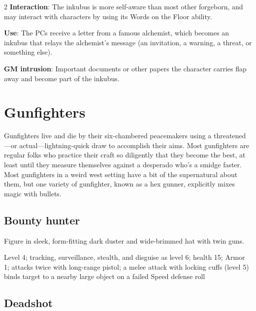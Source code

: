 \begin{multicols}{2}
\textbf{Interaction}: The inkubus is more self-aware than most other forgeborn, and may interact with characters by using its Words on the Floor ability. 

\textbf{Use}: The PCs receive a letter from a famous alchemist, which becomes an inkubus that relays the alchemist’s message (an invitation, a warning, a threat, or something else).

\textbf{GM intrusion}: Important documents or other papers the character carries flap away and become part of the inkubus.

\section{Gunfighters}

Gunfighters live and die by their six-chambered peacemakers using a threatened—or actual—lightning-quick draw to accomplish their aims. Most gunfighters are regular folks who practice their craft so diligently that they become the best, at least until they measure themselves against a desperado who’s a smidge faster. Most gunfighters in a weird west setting have a bit of the supernatural about them, but one variety of gunfighter, known as a hex gunner, explicitly mixes magic with bullets.


\subsection{Bounty hunter}

Figure in sleek, form-fitting dark duster and wide-brimmed hat with twin guns. 

Level 4; tracking, surveillance, stealth, and disguise as level 6; health 15; Armor 1; attacks twice with long-range pistol; a melee attack with locking cuffs (level 5) binds target to a nearby large object on a failed Speed defense roll 

\subsection{Deadshot}


\end{multicols}
